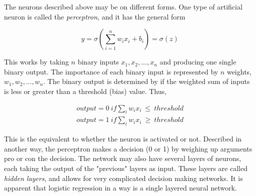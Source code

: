 \documentclass[a4paper,11pt,twocolumn]{article}
\begin{document}
The neurons described above may be on different forms. One type of artificial neuron is called the \textit{perceptron}, and it has the general form 

\begin{equation}
y = \sigma (\sum\limits_{i=1}^n w_ix_i + b_i) = \sigma (z)
\label{neu1}
\end{equation}

This works by taking $n$ binary inputs $x_1,x_2,...,x_n$ and producing one single binary output. The importance of each binary input is represented by $n$ weights, $w_1,w_2,...,w_n$. The binary output is determined by if the weighted sum of inputs is less or greater than a threshold (bias) value. Thus,

\begin{equation*}
\begin{aligned}
output = 0 \ if \sum_i w_ix_i \ \leq \ threshold \\
output = 1 \ if \sum_i w_ix_i \ \geq \ threshold
\end{aligned}
\end{equation*}

This is the equivalent to whether the neuron is activated or not. Described in another way, the perceptron makes a decision (0 or 1) by weighing up arguments pro or con the decision. The network may also have several layers of neurons, each taking the output of the "previous" layers as input. These layers are called \textit{hidden layers}, and allows for very complicated decision making networks. It is apparent that logistic regression in a way is a single layered neural network.
\\ 

\end{document}
